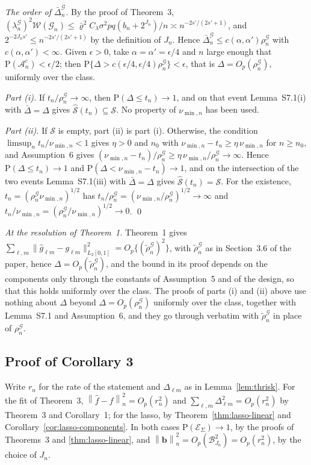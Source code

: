 \documentclass[10pt]{book}
\theoremstyle{definition}
\newcommand{\Prob}{\mathrm{P}}
\newcommand{\normn}[1]{\left\lVert #1 \right\rVert_{n}}
\newcommand{\cv}{\ell}
\newcommand{\md}{m}
\newcommand{\gcomp}[2]{g_{#1#2}}
\newcommand{\pen}{\lambda}
\newcommand{\seff}{s'}
\newcommand{\bb}{\mathbf{b}}
\newcommand{\Gcal}{\mathcal{G}}
\newcommand{\Wcal}{\mathcal{W}}
\newcommand{\bn}{b_{n}}
\newcommand{\lamG}{\lambda^{\mathcal{G}}_{n}}
\newcommand{\rhoG}{\rho^{\mathcal{G}}_{n}}
\newcommand{\rhoGt}{\tilde{\rho}^{\mathcal{G}}_{n}}
\newcommand{\ESig}{\mathcal{E}_{\Sigma}}
\newcommand{\Acal}{\mathcal{A}_{n}}
\newcommand{\Dbl}{\Delta_{\cv\md}}
\begin{document}
{\emph{The order of $\bar{\Delta}^{\Gcal}_n$.} By the proof of Theorem~3,
$(\lamG)^{2}\Wcal(\Gcal_{n}) \le \bar\varrho^{2}C_{\pen}\sigma^{2}pq(\bn +
2^{J_n})/n \asymp n^{-2\seff/(2\seff+1)}$, and $2^{-2J_n\seff} \le
n^{-2\seff/(2\seff+1)}$ by the definition of $J_n$. Hence
$\bar{\Delta}^{\Gcal}_n \le c(\alpha,\alpha')\rhoG$ with
$c(\alpha,\alpha') < \infty$. Given $\epsilon > 0$, take
$\alpha = \alpha' = \epsilon/4$ and $n$ large enough that
$\Prob(\Acal^{c}) < \epsilon/2$; then
$\Prob\{\Delta > c(\epsilon/4,\epsilon/4)\rhoG\} < \epsilon$, that is
$\Delta = O_p(\rhoG)$, uniformly over the class.

\emph{Part (i).} If $t_n/\rhoG \to \infty$, then $\Prob(\Delta \le t_n) \to 1$,
and on that event Lemma~S7.1(i) with $\bar{\Delta} = \Delta$ gives
$\widehat{\mathcal{S}}(t_n) \subseteq \mathcal{S}$. No property of
$\nu_{\min,n}$ has been used.

\emph{Part (ii).} If $\mathcal{S}$ is empty, part (ii) is part (i). Otherwise,
the condition $\limsup_n t_n/\nu_{\min,n} < 1$ gives $\eta > 0$ and $n_0$ with
$\nu_{\min,n} - t_n \ge \eta\,\nu_{\min,n}$ for $n \ge n_0$, and Assumption~6
gives $(\nu_{\min,n} - t_n)/\rhoG \ge \eta\,\nu_{\min,n}/\rhoG \to \infty$.
Hence $\Prob(\Delta \le t_n) \to 1$ and
$\Prob(\Delta < \nu_{\min,n} - t_n) \to 1$, and on the intersection of the two
events Lemma~S7.1(iii) with $\bar{\Delta} = \Delta$ gives
$\widehat{\mathcal{S}}(t_n) = \mathcal{S}$. For the existence,
$t_n = (\rhoG\nu_{\min,n})^{1/2}$ has
$t_n/\rhoG = (\nu_{\min,n}/\rhoG)^{1/2} \to \infty$ and
$t_n/\nu_{\min,n} = (\rhoG/\nu_{\min,n})^{1/2} \to 0$. \qed

\emph{At the resolution of Theorem~1.} Theorem~1 gives
$\sum_{\cv,\md}\lVert\widehat{g}_{\cv\md}-\gcomp{\cv}{\md}\rVert^2_{L_2[0,1]}
= O_p\{(\rhoGt)^{2}\}$, with $\rhoGt$ as in Section~3.6 of the paper, hence
$\Delta = O_p(\rhoGt)$, and the bound in its proof depends on the components
only through the constants of Assumption~5 and of the design, so that this
holds uniformly over the class. The proofs of parts (i) and (ii) above use
nothing about $\Delta$ beyond $\Delta = O_p(\rhoG)$ uniformly over the class,
together with Lemma~S7.1 and Assumption~6, and they go through verbatim with
$\rhoGt$ in place of $\rhoG$.

\subsection*{Proof of Corollary 3}

Write $r_n$ for the rate of the statement and $\Dbl$ as in
Lemma~\ref{lem:thrisk}. For the fit of Theorem~3,
$\normn{\widehat{f}-f}^{2} = O_p(r_n^{2})$ and
$\sum_{\cv,\md}\Dbl^{2} = O_p(r_n^{2})$ by Theorem~3 and Corollary~1; for the
lasso, by Theorem~\ref{thm:lasso-linear} and
Corollary~\ref{cor:lasso-components}. In both cases
$\Prob(\ESig) \to 1$, by the proofs of Theorems~3 and \ref{thm:lasso-linear},
and $\normn{\bb}^{2} = O_p(\mathcal{B}_{J_n}^{2}) = O_p(r_n^{2})$, by the choice
of $J_n$.

}
\end{document}
